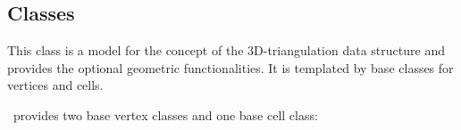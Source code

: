 \subsection*{Classes}


This class is a model for the concept of the 3D-triangulation data
structure  and provides the optional geometric
functionalities. It is templated by base classes for vertices and cells.


\cgal\ provides two base vertex classes and one base cell class:

\\
\\

